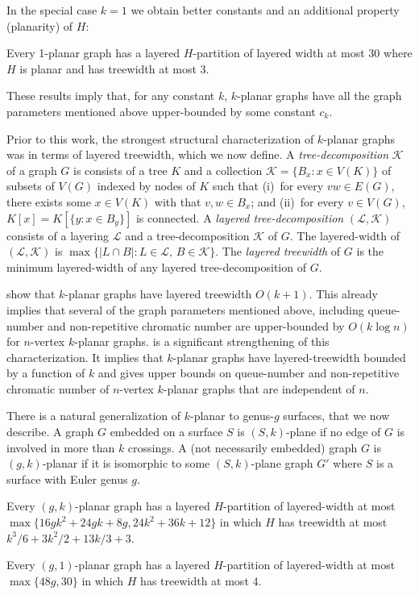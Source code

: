 \documentclass{patmorin}
\newcommand{\treewidth}{\ensuremath{k^3/6 + 3k^2/2 + 13k/3 + 3}}
\begin{document}
In the special case $k=1$ we obtain better constants and an additional property (planarity) of $H$:

\begin{thm}
  Every 1-planar graph has a layered $H$-partition of layered width at most 30 where $H$ is planar and has treewidth at most 3.
\end{thm}

These results imply that, for any constant $k$, $k$-planar graphs have all the graph parameters mentioned above upper-bounded by some constant $c_k$.

Prior to this work, the strongest structural characterization of $k$-planar graphs was in terms of layered treewidth, which we now define.  A \emph{tree-decomposition} $\mathcal{K}$ of a graph $G$ is consists of a tree $K$ and a collection $\mathcal{K}=\{B_x:x\in V(K)\}$ of subsets of $V(G)$ indexed by nodes of $K$ such that (i)~for every $vw\in E(G)$, there exists some $x\in V(K)$ with that $v,w\in B_x$; and (ii)~for every $v\in V(G)$, $K[x] = K[\{y: x\in B_y\}]$ is connected.  A \emph{layered tree-decomposition} $(\mathcal{L},\mathcal{K})$ consists of a layering $\mathcal{L}$ and a tree-decomposition $\mathcal{K}$ of $G$. The layered-width of $(\mathcal{L},\mathcal{K})$ is $\max\{|L\cap B|: L\in \mathcal{L},\, B\in \mathcal{K}\}$.  The \emph{layered treewidth} of $G$ is the minimum layered-width of any layered tree-decomposition of $G$.

\citet{dujmovic.eppstein.ea:structure} show that $k$-planar graphs have layered treewidth $O(k+1)$.  This already implies that several of the graph parameters mentioned above, including queue-number and non-repetitive chromatic number are upper-bounded by $O(k\log n)$ for $n$-vertex $k$-planar graphs.  is a significant strengthening of this characterization. It implies that $k$-planar graphs have layered-treewidth bounded by a function of $k$ and gives upper bounds on queue-number and non-repetitive chromatic number of $n$-vertex $k$-planar graphs that are independent of $n$.

There is a natural generalization of $k$-planar to genus-$g$ surfaces, that we now describe.  A graph $G$ embedded on a surface $S$ is $(S,k)$-plane if no edge of $G$ is involved in more than $k$ crossings.  A (not necessarily embedded) graph $G$ is $(g,k)$-planar if it is isomorphic to some $(S,k)$-plane graph $G'$ where $S$ is a surface with Euler genus $g$.

\begin{thm}
  Every $(g,k)$-planar graph has a layered $H$-partition of layered-width at most $\max\{16gk^2 + 24gk + 8g, 24k^2 + 36k + 12\}$ in which $H$ has treewidth at most $\treewidth$.
  
  Every $(g,1)$-planar graph has a layered $H$-partition of layered-width at most $\max\{48g, 30\}$ in which $H$ has treewidth at most $4$.  
\end{thm}
\end{document}
